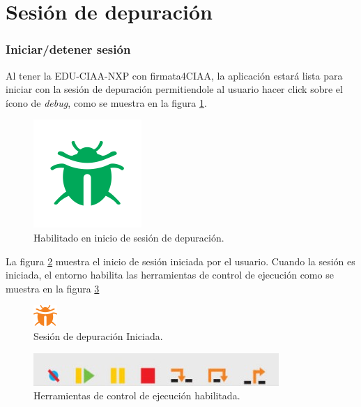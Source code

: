\section{Sesión de depuración}
\label{sec:Sesión de depuración}

\subsubsection{Iniciar/detener sesión}
\label{subsubsec:Iniciar/detener sesión}

Al tener la EDU-CIAA-NXP con firmata4CIAA, la aplicación estará lista para iniciar con la sesión de depuración permitiendole al usuario hacer click sobre el ícono de \emph{debug}, como se muestra en la figura \ref{fig:debug_view_habilitada}.

\begin{figure}[h]
	\centering
	\includegraphics[scale=.65]{./Figures/debug_active_green.PNG}
	\caption{Habilitado en inicio de sesión de depuración.}
	\label{fig:debug_view_habilitada}
\end{figure}

La figura \ref{fig:debug_view} muestra el inicio de sesión iniciada por el usuario. Cuando la sesión es iniciada, el entorno habilita las herramientas de control de ejecución como se muestra en la figura \ref{fig:herramientas-control-ejecucion}

\begin{figure}[h]
	\centering
	\includegraphics[scale=.65]{./Figures/debug_view.PNG}
	\caption{Sesión de depuración Iniciada.}
	\label{fig:debug_view}
\end{figure}

\begin{figure}[h]
	\centering
	\includegraphics[scale=.65]{./Figures/herramientas-control-ejecucion.PNG}
	\caption{Herramientas de control de ejecución habilitada.}
	\label{fig:herramientas-control-ejecucion}
\end{figure}


